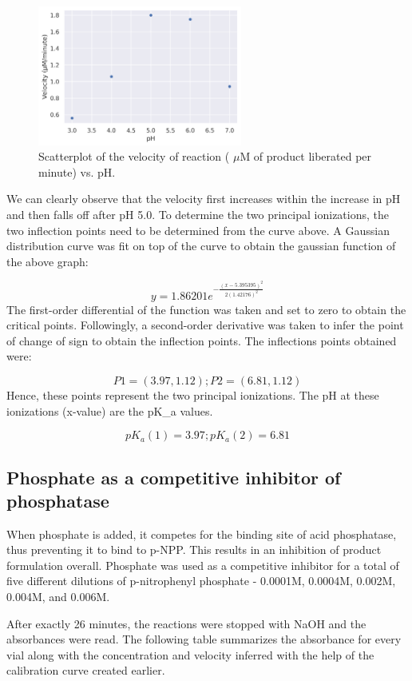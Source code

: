 \documentclass[pdflatex,sn-mathphys]{sn-jnl}%
\theoremstyle{thmstyleone}%
\theoremstyle{thmstyletwo}%
\theoremstyle{thmstylethree}%
\begin{document}
\begin{figure}[h]
  \centering
  \includegraphics[width=0.6\textwidth]{photos/pH_plot.png}
  \caption{Scatterplot of the velocity of reaction ( $\mu$M of product liberated per minute) vs. pH. }\label{fig1}
\end{figure}

We can clearly observe that the velocity first increases within the increase in
pH and then falls off after pH 5.0. To determine the two principal ionizations,
the two inflection points need to be determined from the curve above. A
Gaussian distribution curve was fit on top of the curve to obtain the gaussian
function of the above graph:

\[y = 1.86201e^{-\frac{(x - 5.395395)^2}{2(1.42176)^2}}\]
The first-order differential of the function was taken and set to zero to
obtain the critical points. Followingly, a second-order derivative was taken to
infer the point of change of sign to obtain the inflection points. The
inflections points obtained were:

\[P1 = (3.97, 1.12); P2 = (6.81, 1.12)\]
Hence, these points represent the two principal ionizations. The pH at these
ionizations (x-value) are the pK_a values.

\[pK_a (1) = 3.97; pK_a (2) = 6.81\]

\subsection{Phosphate as a competitive inhibitor of phosphatase}
When phosphate is added, it competes for the binding site of acid phosphatase,
thus preventing it to bind to p-NPP. This results in an inhibition of product
formulation overall. Phosphate was used as a competitive inhibitor for a total
of five different dilutions of p-nitrophenyl phosphate - 0.0001M, 0.0004M,
0.002M, 0.004M, and 0.006M.

After exactly 26 minutes, the reactions were stopped with NaOH and the
absorbances were read. The following table summarizes the absorbance for every
vial along with the concentration and velocity inferred with the help of the
calibration curve created earlier.
\end{document}
